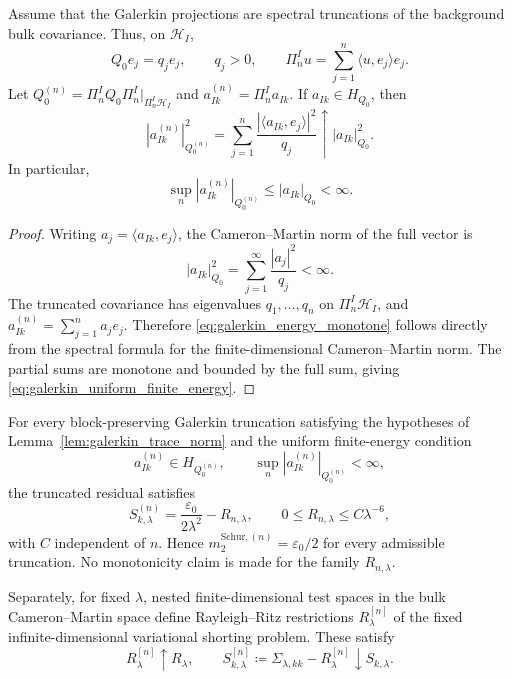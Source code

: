 \begin{lemma}
\label{lem:galerkin_finite_energy_monotonicity}
Assume that the Galerkin projections are spectral truncations of the background
bulk covariance.  Thus, on $\mathcal{H}_I$,
\[
  Q_0e_j=q_je_j,
  \qquad q_j>0,
  \qquad
  \Pi_n^I u=\sum_{j=1}^n \langle u,e_j\rangle e_j.
\]
Let $Q_0^{(n)}=\Pi_n^I Q_0\Pi_n^I|_{\Pi_n^I\mathcal{H}_I}$ and
$a_{Ik}^{(n)}=\Pi_n^I a_{Ik}$.  If $a_{Ik}\in H_{Q_0}$, then
\begin{equation}
  |a_{Ik}^{(n)}|_{Q_0^{(n)}}^2
  =
  \sum_{j=1}^n\frac{|\langle a_{Ik},e_j\rangle|^2}{q_j}
  \uparrow
  |a_{Ik}|_{Q_0}^2.
  \label{eq:galerkin_energy_monotone}
\end{equation}
In particular,
\begin{equation}
  \sup_n |a_{Ik}^{(n)}|_{Q_0^{(n)}}
  \le |a_{Ik}|_{Q_0}<\infty.
  \label{eq:galerkin_uniform_finite_energy}
\end{equation}
\end{lemma}

\begin{proof}
Writing $a_j=\langle a_{Ik},e_j\rangle$, the Cameron--Martin norm of the
full vector is
\[
  |a_{Ik}|_{Q_0}^2=\sum_{j=1}^\infty\frac{|a_j|^2}{q_j}<\infty.
\]
The truncated covariance has eigenvalues $q_1,\ldots,q_n$ on
$\Pi_n^I\mathcal{H}_I$, and $a_{Ik}^{(n)}=\sum_{j=1}^n a_je_j$.  Therefore
\eqref{eq:galerkin_energy_monotone} follows directly from the spectral formula
for the finite-dimensional Cameron--Martin norm.  The partial sums are monotone
and bounded by the full sum, giving \eqref{eq:galerkin_uniform_finite_energy}.
\end{proof}

\begin{lemma}
\label{lem:galerkin_variational_shorting}
For every block-preserving Galerkin truncation satisfying the hypotheses of
Lemma~\ref{lem:galerkin_trace_norm} and the uniform finite-energy condition
\[
  a_{Ik}^{(n)}\in H_{Q_0^{(n)}},
  \qquad
  \sup_n |a_{Ik}^{(n)}|_{Q_0^{(n)}}<\infty,
\]
the truncated residual satisfies
\[
  S_{k,\lambda}^{(n)}
  =
  \frac{\varepsilon_0}{2\lambda^2}-R_{n,\lambda},
  \qquad
  0\le R_{n,\lambda}\le C\lambda^{-6},
\]
with $C$ independent of $n$.  Hence
$m_2^{\mathrm{Schur},(n)}=\varepsilon_0/2$ for every admissible truncation.
No monotonicity claim is made for the family $R_{n,\lambda}$.

Separately, for fixed $\lambda$, nested finite-dimensional test spaces in the
bulk Cameron--Martin space define Rayleigh--Ritz restrictions
$R_\lambda^{[n]}$ of the fixed infinite-dimensional variational shorting
problem.  These satisfy
\[
  R_\lambda^{[n]}\uparrow R_\lambda,
  \qquad
  S_{k,\lambda}^{[n]}\coloneqq\Sigma_{\lambda,kk}-R_\lambda^{[n]}
  \downarrow S_{k,\lambda}.
\]
\end{lemma}

